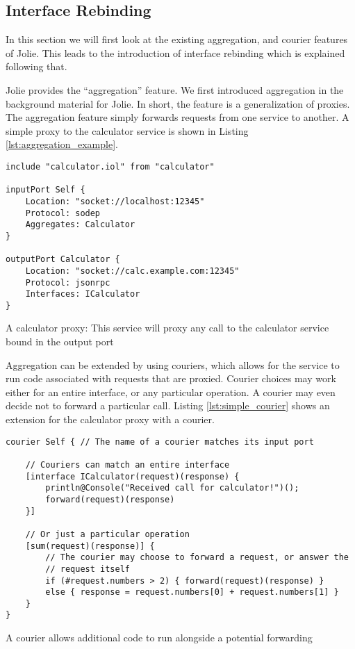 \subsection{Interface Rebinding}
\label{sec:interface_rebinding}

In this section we will first look at the existing aggregation, and courier
features of Jolie. This leads to the introduction of interface rebinding which
is explained following that.

Jolie provides the ``aggregation'' feature. We first introduced aggregation in
the background material for Jolie. In short, the feature is a generalization of
proxies. The aggregation feature simply forwards requests from one service to
another. A simple proxy to the calculator service is shown in Listing
\ref{lst:aggregation_example}.

\begin{listing}[H]
\begin{verbatim}
include "calculator.iol" from "calculator"

inputPort Self {
    Location: "socket://localhost:12345"
    Protocol: sodep
    Aggregates: Calculator
}

outputPort Calculator {
    Location: "socket://calc.example.com:12345"
    Protocol: jsonrpc
    Interfaces: ICalculator
}
\end{verbatim}

\caption{A calculator proxy: This service will proxy any call to the calculator
    service bound in the output port }

\label{lst:aggregation_example}

\end{listing}

Aggregation can be extended by using couriers, which allows for the service to
run code associated with requests that are proxied. Courier choices may work
either for an entire interface, or any particular operation. A courier may even
decide not to forward a particular call. Listing \ref{lst:simple_courier} shows
an extension for the calculator proxy with a courier.

\begin{listing}[H]
\begin{verbatim}
courier Self { // The name of a courier matches its input port

    // Couriers can match an entire interface
    [interface ICalculator(request)(response) {
        println@Console("Received call for calculator!")();
        forward(request)(response)
    }]

    // Or just a particular operation
    [sum(request)(response)] {
        // The courier may choose to forward a request, or answer the
        // request itself
        if (#request.numbers > 2) { forward(request)(response) }
        else { response = request.numbers[0] + request.numbers[1] }
    }
}
\end{verbatim}

\caption{A courier allows additional code to run alongside a potential
    forwarding}

\label{lst:simple_courier}

\end{listing}

